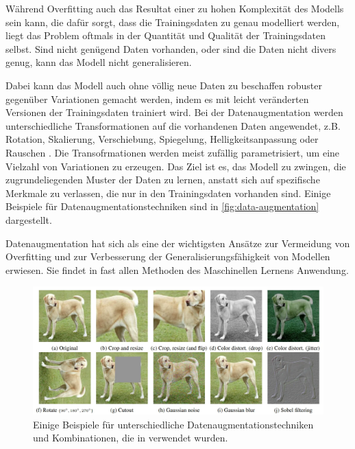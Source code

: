 Während Overfitting auch das Resultat einer zu hohen Komplexität des Modells sein kann, die dafür sorgt, dass die Trainingsdaten zu genau modelliert werden, liegt das Problem oftmals in der Quantität und Qualität der Trainingsdaten selbst. Sind nicht genügend Daten vorhanden, oder sind die Daten nicht divers genug, kann das Modell nicht generalisieren.

Dabei kann das Modell auch ohne völlig neue Daten zu beschaffen robuster gegenüber Variationen gemacht werden, indem es mit leicht veränderten Versionen der Trainingsdaten trainiert wird. Bei der Datenaugmentation werden unterschiedliche Transformationen auf die vorhandenen Daten angewendet, z.B. Rotation, Skalierung, Verschiebung, Spiegelung, Helligkeitsanpassung oder Rauschen \parencite{Shorten2019dataaugmentation}. Die Transofrmationen werden meist zufällig parametrisiert, um eine Vielzahl von Variationen zu erzeugen. Das Ziel ist es, das Modell zu zwingen, die zugrundeliegenden Muster der Daten zu lernen, anstatt sich auf spezifische Merkmale zu verlassen, die nur in den Trainingsdaten vorhanden sind. Einige Beispiele für Datenaugmentationstechniken sind in \autoref{fig:data-augmentation} dargestellt.

Datenaugmentation hat sich als eine der wichtigsten Ansätze zur Vermeidung von Overfitting und zur Verbesserung der Generalisierungsfähigkeit von Modellen erwiesen. Sie findet in fast allen Methoden des Maschinellen Lernens Anwendung.

\begin{figure}[t]
	\centering
	\includegraphics[width=\textwidth]{images/figure_data_augmentation.png}
	\caption{Einige Beispiele für unterschiedliche Datenaugmentationstechniken\\
	und Kombinationen, die in \parencite{Chen2020simclr} verwendet wurden.}
	\label{fig:data-augmentation}
\end{figure}

